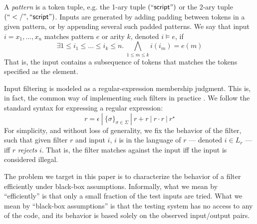 A \emph{pattern} is a token tuple, e.g. the 1-ary tuple ${\sf (``script")}$ or the 2-ary tuple $\sf{(``</",``script")}$. Inputs are generated by adding padding between tokens in a given pattern, or by appending several such padded patterns. We say that input $i=x_1, \ldots ,x_n$ matches pattern $e$ or arity $k$, denoted $i \models e$, if
$$
\exists 1 \leq i_1 \leq \ldots \leq i_k \leq n.\ \bigwedge_{1 \leq m \leq k}
i(i_m) = e(m)  
$$
That is, the input contains a subsequence of tokens that matches the tokens specified as the element.

Input filtering is modeled as a regular-expression membership judgment. This is, in fact, the common way of implementing such filters in practice \cite{XXX}. We follow the standard syntax for expressing a regular expression:
$$
	r = \epsilon\ |\ \{ \sigma \}_{\sigma \in \Sigma}\ |\ r + r\ |\ r \cdot r\ |\ r^{\star}
$$
For simplicity, and without loss of generality, we fix the behavior of the filter, such that given filter $r$ and input $i$, $i$ is in the language of $r$ --- denoted $i \in L_r$ --- iff $r$ \emph{rejects} $i$. That is, the filter matches against the input iff the input is considered illegal.

The problem we target in this paper is to characterize the behavior of a filter efficiently under black-box assumptions. Informally, what we mean by ``efficiently'' is that only a small fraction of the test inputs are tried. What we mean by ``black-box assumptions'' is that the testing system has no access to any of the code, and its behavior is based solely on the observed input/output pairs.



